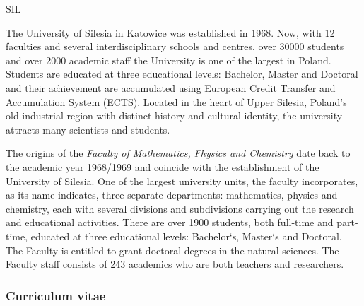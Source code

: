 \begin{sitedescription}{SIL}

The University of Silesia in Katowice was established in 1968. Now,
with 12 faculties and several interdisciplinary schools and centres,
over 30000 students and over 2000 academic staff the University is one
of the largest in Poland. Students are educated at three educational
levels: Bachelor, Master and Doctoral and their achievement are
accumulated using European Credit Transfer and Accumulation System
(ECTS). Located in the heart of Upper Silesia, Poland's old industrial
region with distinct history and cultural identity, the university
attracts many scientists and students.

The origins of the {\em Faculty of Mathematics, Fhysics and Chemistry} date
back to the academic year 1968/1969 and coincide with the
establishment of the University of Silesia. One of the largest
university units, the faculty incorporates, as its name indicates,
three separate departments: mathematics, physics and chemistry, each
with several divisions and subdivisions carrying out the research and
educational activities. There are over 1900 students, both full-time
and part-time, educated at three educational levels: Bachelor`s,
Master`s and Doctoral. The Faculty is entitled to grant doctoral
degrees in the natural sciences. The Faculty staff consists of 243
academics who are both teachers and researchers.

%

\subsubsection*{Curriculum vitae}


%
%
%



\end{sitedescription}
